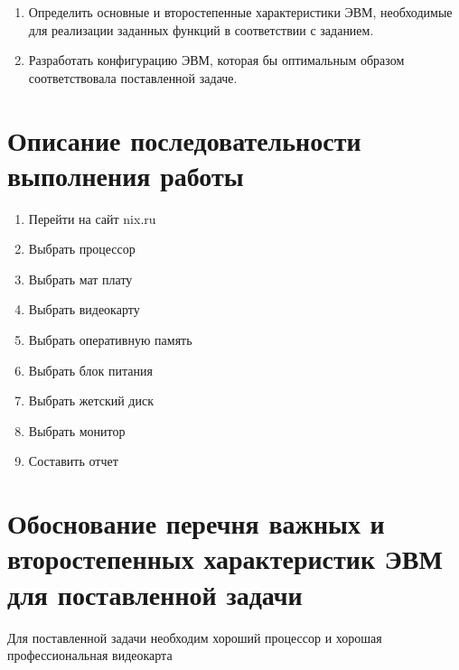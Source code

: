 \documentclass[a4paper]{article}
\begin{document}
\begin{enumerate}
\item Определить основные и второстепенные характеристики ЭВМ, необходимые для реализации заданных функций в соответствии с заданием.
\item Разработать конфигурацию ЭВМ, которая бы оптимальным образом соответствовала поставленной задаче. 
\end{enumerate}

\section{Описание последовательности выполнения работы}

\begin{enumerate}
    \item Перейти на сайт nix.ru
    \item Выбрать процессор
    \item Выбрать мат плату
    \item Выбрать видеокарту
    \item Выбрать оперативную память
    \item Выбрать блок питания
    \item Выбрать жетский диск
    \item Выбрать монитор
    \item Составить отчет
\end{enumerate}

\section{Обоснование перечня важных и второстепенных характеристик ЭВМ для поставленной задачи}
Для поставленной задачи необходим хороший процессор и хорошая профессиональная видеокарта
\end{document}
